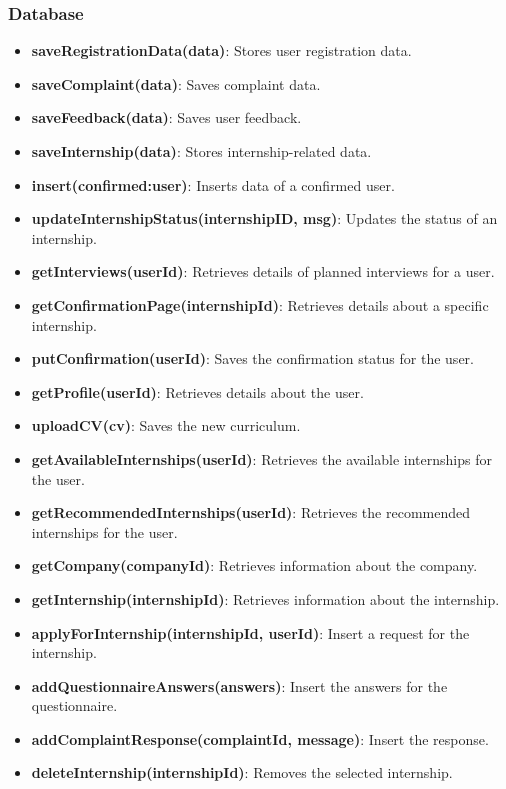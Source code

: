 \subsubsection{Database}
\begin{itemize}
    \item \textbf{saveRegistrationData(data)}: Stores user registration data.
    \item \textbf{saveComplaint(data)}: Saves complaint data.
    \item \textbf{saveFeedback(data)}: Saves user feedback.
    \item \textbf{saveInternship(data)}: Stores internship-related data.
    \item \textbf{insert(confirmed:user)}: Inserts data of a confirmed user.
    \item \textbf{updateInternshipStatus(internshipID, msg)}: Updates the status of an internship.
    \item \textbf{getInterviews(userId)}: Retrieves details of planned interviews for a user.
    \item \textbf{getConfirmationPage(internshipId)}: Retrieves details about a specific internship.
    \item \textbf{putConfirmation(userId)}: Saves the confirmation status for the user.
    \item \textbf{getProfile(userId)}: Retrieves details about the user.
    \item \textbf{uploadCV(cv)}: Saves the new curriculum.
    \item \textbf{getAvailableInternships(userId)}: Retrieves the available internships for the user.
    \item \textbf{getRecommendedInternships(userId)}: Retrieves the recommended internships for the user.
    \item \textbf{getCompany(companyId)}: Retrieves information about the company.
    \item \textbf{getInternship(internshipId)}: Retrieves information about the internship.
    \item \textbf{applyForInternship(internshipId, userId)}: Insert a request for the internship.
    \item \textbf{addQuestionnaireAnswers(answers)}: Insert the answers for the questionnaire.
    \item \textbf{addComplaintResponse(complaintId, message)}: Insert the response.
    \item \textbf{deleteInternship(internshipId)}: Removes the selected internship.
\end{itemize}

